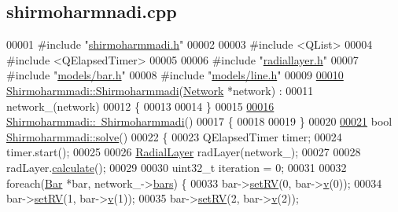 \hypertarget{shirmoharmnadi_8cpp_source}{}\subsection{shirmoharmnadi.\+cpp}
\label{shirmoharmnadi_8cpp_source}

\begin{DoxyCode}
00001 \textcolor{preprocessor}{#include "\hyperlink{shirmoharmmadi_8h}{shirmoharmmadi.h}"}
00002 
00003 \textcolor{preprocessor}{#include <QList>}
00004 \textcolor{preprocessor}{#include <QElapsedTimer>}
00005 
00006 \textcolor{preprocessor}{#include "\hyperlink{radiallayer_8h}{radiallayer.h}"}
00007 \textcolor{preprocessor}{#include "\hyperlink{bar_8h}{models/bar.h}"}
00008 \textcolor{preprocessor}{#include "\hyperlink{line_8h}{models/line.h}"}
00009 
\hypertarget{shirmoharmnadi_8cpp_source_l00010}{}\hyperlink{class_shirmoharmmadi_aa5833386f9b43019a318c81a3006e2b1}{00010} \hyperlink{class_shirmoharmmadi_aa5833386f9b43019a318c81a3006e2b1}{Shirmoharmmadi::Shirmoharmmadi}(\hyperlink{class_network}{Network} *network) :
00011   network\_(network)
00012 \{
00013 
00014 \}
00015 
\hypertarget{shirmoharmnadi_8cpp_source_l00016}{}\hyperlink{class_shirmoharmmadi_ac89016d70d3c99339af11f3b6f1f23b2}{00016} \hyperlink{class_shirmoharmmadi_ac89016d70d3c99339af11f3b6f1f23b2}{Shirmoharmmadi::~Shirmoharmmadi}()
00017 \{
00018 
00019 \}
00020 
\hypertarget{shirmoharmnadi_8cpp_source_l00021}{}\hyperlink{class_shirmoharmmadi_acb4a06c62b5d97c25bea70acd477e715}{00021} \textcolor{keywordtype}{bool} \hyperlink{class_shirmoharmmadi_acb4a06c62b5d97c25bea70acd477e715}{Shirmoharmmadi::solve}()
00022 \{
00023   QElapsedTimer timer;
00024   timer.start();
00025 
00026   \hyperlink{class_radial_layer}{RadialLayer} radLayer(network\_);
00027 
00028   radLayer.\hyperlink{class_radial_layer_a971680f24ba6c516afedbc49d8c22cab}{calculate}();
00029 
00030   uint32\_t iteration = 0;
00031 
00032   \textcolor{keywordflow}{foreach}(\hyperlink{class_bar}{Bar} *bar, network\_->\hyperlink{class_network_a7fe628f7de34a96235cbd3f2cee4aff2}{bars}) \{
00033     bar->\hyperlink{group___models_ga2b2c5a373d87025e79d26aa9c4cea75a}{setRV}(0, bar->\hyperlink{group___models_ga1e6f2daec86407118656d88170d1adc2}{v}(0));
00034     bar->\hyperlink{group___models_ga2b2c5a373d87025e79d26aa9c4cea75a}{setRV}(1, bar->\hyperlink{group___models_ga1e6f2daec86407118656d88170d1adc2}{v}(1));
00035     bar->\hyperlink{group___models_ga2b2c5a373d87025e79d26aa9c4cea75a}{setRV}(2, bar->\hyperlink{group___models_ga1e6f2daec86407118656d88170d1adc2}{v}(2));

\end{DoxyCode}
